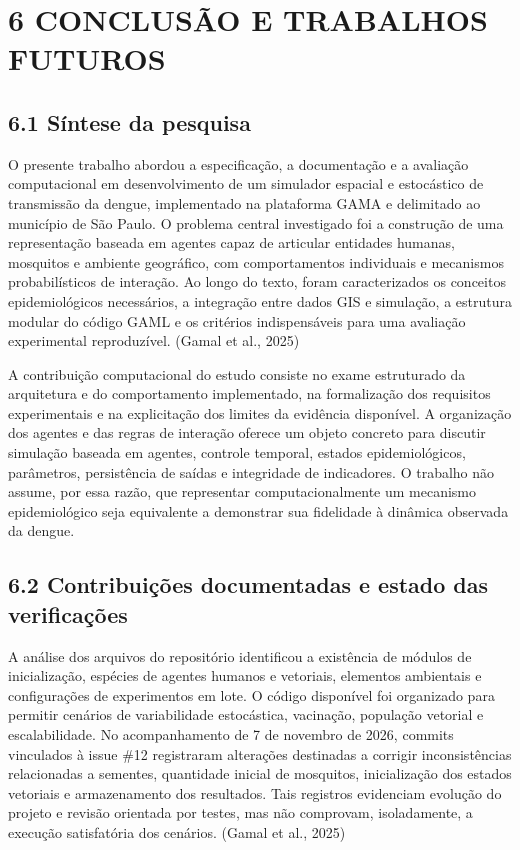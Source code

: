 \section{6 CONCLUSÃO E TRABALHOS
FUTUROS}\label{conclusuxe3o-e-trabalhos-futuros}

\subsection{6.1 Síntese da pesquisa}\label{suxedntese-da-pesquisa}

O presente trabalho abordou a especificação, a documentação e a
avaliação computacional em desenvolvimento de um simulador espacial e
estocástico de transmissão da dengue, implementado na plataforma GAMA e
delimitado ao município de São Paulo. O problema central investigado foi
a construção de uma representação baseada em agentes capaz de articular
entidades humanas, mosquitos e ambiente geográfico, com comportamentos
individuais e mecanismos probabilísticos de interação. Ao longo do
texto, foram caracterizados os conceitos epidemiológicos necessários, a
integração entre dados GIS e simulação, a estrutura modular do código
GAML e os critérios indispensáveis para uma avaliação experimental
reproduzível. (Gamal et al., 2025)

A contribuição computacional do estudo consiste no exame estruturado da
arquitetura e do comportamento implementado, na formalização dos
requisitos experimentais e na explicitação dos limites da evidência
disponível. A organização dos agentes e das regras de interação oferece
um objeto concreto para discutir simulação baseada em agentes, controle
temporal, estados epidemiológicos, parâmetros, persistência de saídas e
integridade de indicadores. O trabalho não assume, por essa razão, que
representar computacionalmente um mecanismo epidemiológico seja
equivalente a demonstrar sua fidelidade à dinâmica observada da dengue.

\subsection{6.2 Contribuições documentadas e estado das
verificações}\label{contribuiuxe7uxf5es-documentadas-e-estado-das-verificauxe7uxf5es}

A análise dos arquivos do repositório identificou a existência de
módulos de inicialização, espécies de agentes humanos e vetoriais,
elementos ambientais e configurações de experimentos em lote. O código
disponível foi organizado para permitir cenários de variabilidade
estocástica, vacinação, população vetorial e escalabilidade. No
acompanhamento de 7 de novembro de 2026, commits vinculados à issue \#12
registraram alterações destinadas a corrigir inconsistências
relacionadas a sementes, quantidade inicial de mosquitos, inicialização
dos estados vetoriais e armazenamento dos resultados. Tais registros
evidenciam evolução do projeto e revisão orientada por testes, mas não
comprovam, isoladamente, a execução satisfatória dos cenários. (Gamal et
al., 2025)

